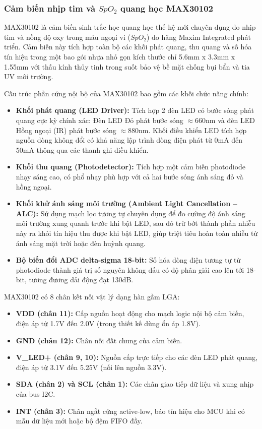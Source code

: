 \subsubsection{Cảm biến nhịp tim và $SpO_2$ quang học MAX30102}
MAX30102 là cảm biến sinh trắc học quang học thế hệ mới chuyên dụng đo nhịp tim và nồng độ oxy trong máu ngoại vi ($SpO_2$) do hãng Maxim Integrated phát triển. Cảm biến này tích hợp toàn bộ các khối phát quang, thu quang và số hóa tín hiệu trong một bao gói nhựa nhỏ gọn kích thước chỉ 5.6mm x 3.3mm x 1.55mm với thấu kính thủy tinh trong suốt bảo vệ bề mặt chống bụi bẩn và tia UV môi trường.

Cấu trúc phần cứng nội bộ của MAX30102 bao gồm các khối chức năng chính:
\begin{itemize}
    \item \textbf{Khối phát quang (LED Driver):} Tích hợp 2 đèn LED có bước sóng phát quang cực kỳ chính xác: Đèn LED Đỏ phát bước sóng $\approx 660\text{nm}$ và đèn LED Hồng ngoại (IR) phát bước sóng $\approx 880\text{nm}$. Khối điều khiển LED tích hợp nguồn dòng không đổi có khả năng lập trình dòng điện phát từ 0mA đến 50mA thông qua các thanh ghi điều khiển.
    \item \textbf{Khối thu quang (Photodetector):} Tích hợp một cảm biến photodiode nhạy sáng cao, có phổ nhạy phù hợp với cả hai bước sóng ánh sáng đỏ và hồng ngoại.
    \item \textbf{Khối khử ánh sáng môi trường (Ambient Light Cancellation -- ALC):} Sử dụng mạch lọc tương tự chuyên dụng để đo cường độ ánh sáng môi trường xung quanh trước khi bật LED, sau đó trừ bớt thành phần nhiễu này ra khỏi tín hiệu thu được khi bật LED, giúp triệt tiêu hoàn toàn nhiễu từ ánh sáng mặt trời hoặc đèn huỳnh quang.
    \item \textbf{Bộ biến đổi ADC delta-sigma 18-bit:} Số hóa dòng điện tương tự từ photodiode thành giá trị số nguyên không dấu có độ phân giải cao lên tới 18-bit, tương đương dải động đạt 130dB.
\end{itemize}

MAX30102 có 8 chân kết nối vật lý dạng hàn gầm LGA:
\begin{itemize}
    \item \textbf{VDD (chân 11):} Cấp nguồn hoạt động cho mạch logic nội bộ cảm biến, điện áp từ 1.7V đến 2.0V (trong thiết kế dùng ổn áp 1.8V).
    \item \textbf{GND (chân 12):} Chân nối đất chung của cảm biến.
    \item \textbf{V\_LED+ (chân 9, 10):} Nguồn cấp trực tiếp cho các đèn LED phát quang, điện áp từ 3.1V đến 5.25V (nối lên nguồn 3.3V).
    \item \textbf{SDA (chân 2) và SCL (chân 1):} Các chân giao tiếp dữ liệu và xung nhịp của bus I2C.
    \item \textbf{INT (chân 3):} Chân ngắt cứng active-low, báo tín hiệu cho MCU khi có mẫu dữ liệu mới hoặc bộ đệm FIFO đầy.
\end{itemize}

